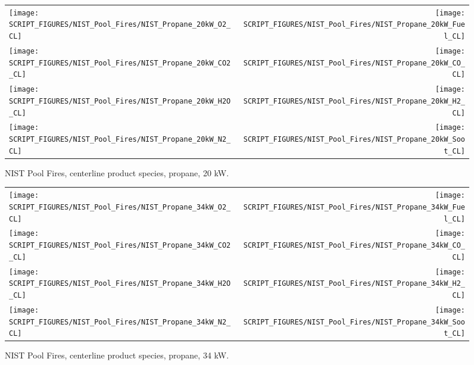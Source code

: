 \begin{figure}[p]
\begin{tabular*}{\textwidth}{l@{\extracolsep{\fill}}r}
\texttt{[image: SCRIPT\_FIGURES/NIST\_Pool\_Fires/NIST\_Propane\_20kW\_O2\_CL]} &
\texttt{[image: SCRIPT\_FIGURES/NIST\_Pool\_Fires/NIST\_Propane\_20kW\_Fuel\_CL]} \\
\texttt{[image: SCRIPT\_FIGURES/NIST\_Pool\_Fires/NIST\_Propane\_20kW\_CO2\_CL]} &
\texttt{[image: SCRIPT\_FIGURES/NIST\_Pool\_Fires/NIST\_Propane\_20kW\_CO\_CL]}    \\
\texttt{[image: SCRIPT\_FIGURES/NIST\_Pool\_Fires/NIST\_Propane\_20kW\_H2O\_CL]} &
\texttt{[image: SCRIPT\_FIGURES/NIST\_Pool\_Fires/NIST\_Propane\_20kW\_H2\_CL]} \\
\texttt{[image: SCRIPT\_FIGURES/NIST\_Pool\_Fires/NIST\_Propane\_20kW\_N2\_CL]} &
\texttt{[image: SCRIPT\_FIGURES/NIST\_Pool\_Fires/NIST\_Propane\_20kW\_Soot\_CL]}
\end{tabular*}
\caption[NIST Pool Fires, centerline product species, propane, 20 kW]{NIST Pool Fires, centerline product species, propane, 20 kW.}
\label{NIST_Pool_Fires_Propane_20kW}
\end{figure}

\begin{figure}[p]
\begin{tabular*}{\textwidth}{l@{\extracolsep{\fill}}r}
\texttt{[image: SCRIPT\_FIGURES/NIST\_Pool\_Fires/NIST\_Propane\_34kW\_O2\_CL]} &
\texttt{[image: SCRIPT\_FIGURES/NIST\_Pool\_Fires/NIST\_Propane\_34kW\_Fuel\_CL]} \\
\texttt{[image: SCRIPT\_FIGURES/NIST\_Pool\_Fires/NIST\_Propane\_34kW\_CO2\_CL]} &
\texttt{[image: SCRIPT\_FIGURES/NIST\_Pool\_Fires/NIST\_Propane\_34kW\_CO\_CL]}    \\
\texttt{[image: SCRIPT\_FIGURES/NIST\_Pool\_Fires/NIST\_Propane\_34kW\_H2O\_CL]} &
\texttt{[image: SCRIPT\_FIGURES/NIST\_Pool\_Fires/NIST\_Propane\_34kW\_H2\_CL]} \\
\texttt{[image: SCRIPT\_FIGURES/NIST\_Pool\_Fires/NIST\_Propane\_34kW\_N2\_CL]} &
\texttt{[image: SCRIPT\_FIGURES/NIST\_Pool\_Fires/NIST\_Propane\_34kW\_Soot\_CL]}
\end{tabular*}
\caption[NIST Pool Fires, centerline product species, propane, 34 kW]{NIST Pool Fires, centerline product species, propane, 34 kW.}
\label{NIST_Pool_Fires_Propane_34kW}
\end{figure}
\clearpage

